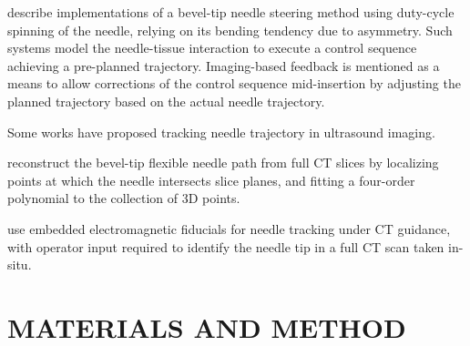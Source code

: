 \documentclass[letterpaper, 10 pt, conference]{ieeeconf}  %
\begin{document}
\cite{wu2013automatic} \cite{engh2010percutaneous} describe implementations of a bevel-tip needle steering method using duty-cycle spinning of the needle, relying on its bending tendency due to asymmetry. Such systems model the needle-tissue interaction to execute a control sequence achieving a pre-planned trajectory. Imaging-based feedback is mentioned as a means to allow corrections of the control sequence mid-insertion by adjusting the planned trajectory based on the actual needle trajectory.

Some works have proposed tracking needle trajectory in ultrasound imaging.

\cite{huo2015shape} reconstruct the bevel-tip flexible needle path from full CT slices by localizing points at which the needle intersects slice planes, and fitting a four-order polynomial to the collection of 3D points.

\cite{yaniv2010needle} use embedded electromagnetic fiducials for needle tracking under CT guidance, with operator input required to identify the needle tip in a full CT scan taken in-situ.

\section{MATERIALS AND METHOD}
\end{document}
